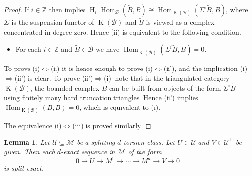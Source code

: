 \documentclass[12pt,reqno]{amsart}
\def\cB{\mathscr{B}}
\def\cM{\mathscr{M}}
\def\cU{\mathscr{U}}
\def\BZ{\mathbb{Z}}
\def\H{\operatorname{H}}
\def\Hom{\operatorname{Hom}}
\def\K{\operatorname{K}}
\numberwithin{equation}{section}
\newtheorem{Lemma}{Lemma}[section]
\theoremstyle{definition}
\theoremstyle{theorem}
\theoremstyle{definition}
\begin{document}
\begin{proof}
If $i \in \BZ$ then \cite[thm.\ 2.3.10]{Christensen-Foxby-Holm_Derived-category-methods} implies $\H_i\!\Hom_{ \cB }( \widetilde{ B },B ) \cong \Hom_{ \K( \cB ) }( \Sigma^i\widetilde{ B },B )$, where $\Sigma$ is the suspension functor of $\K( \cB )$ and $\widetilde{ B }$ is viewed as a complex concentrated in degree zero.  Hence (ii) is equivalent to the following condition.
\begin{itemize}
\setlength\itemsep{4pt}

  \item[(ii')]  For each $i \in \BZ$ and $\widetilde{ B } \in \cB$ we have $\Hom_{ \K( \cB ) }( \Sigma^i\widetilde{ B },B ) = 0$.
  
\end{itemize}
To prove (i)$\Leftrightarrow$(ii) it is hence enough to prove (i)$\Leftrightarrow$(ii'), and the implication (i)$\Rightarrow$(ii') is clear.  To prove (ii')$\Rightarrow$(i), note that in the triangulated category $\K( \cB )$, the bounded complex $B$ can be built from objects of the form $\Sigma^i\widetilde{ B }$ using finitely many hard truncation triangles.  Hence (ii') implies $\Hom_{ \K( \cB ) }( B,B ) = 0$, which is equivalent to (i).

The equivalence (i)$\Leftrightarrow$(iii) is proved similarly.
\end{proof}


\begin{Lemma}
\label{lem:splitting_implies_Ext^d_zero}
Let $\cU \subseteq \cM$ be a splitting $d$-torsion class.  Let $U \in \cU$ and $V \in \cU^{ \perp }$ be given.  Then each $d$-exact sequence in $\cM$ of the form
\begin{equation}
\label{equ:lem:splitting_implies_Ext^d_zero:10}
  0
  \xrightarrow{} U
  \xrightarrow{} M^1
  \xrightarrow{} \cdots
  \xrightarrow{} M^d
  \xrightarrow{} V
  \xrightarrow{} 0
\end{equation}
is split exact.
\end{Lemma}
\end{document}
